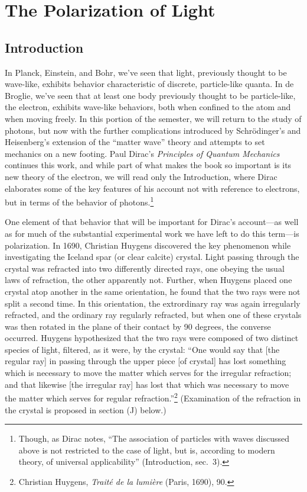 \chapter{The Polarization of Light}



\section*{Introduction}

In Planck, Einstein, and Bohr, we’ve seen that light, previously thought to be wave-like, exhibits behavior characteristic of discrete, particle-like quanta. In de Broglie, we’ve seen that at least one body previously thought to be particle-like, the electron, exhibits wave-like behaviors, both when confined to the atom and when moving freely. In this portion of the semester, we will return to the study of photons, but now with the further complications introduced by Schr\"odinger’s and Heisenberg’s extension of the “matter wave” theory and attempts to set mechanics on a new footing. Paul Dirac’s \emph{Principles of Quantum Mechanics} continues this work, and while part of what makes the book so important is its new theory of the electron, we will read only the Introduction, where Dirac
elaborates some of the key features of his account not with reference to electrons, but in terms of the behavior of photons.\footnote{Though, as Dirac notes, ``The association of particles with waves discussed above is not
	restricted to the case of light, but is, according to modern theory, of universal applicability'' (Introduction, 
	sec.\ 3).}

One element of that behavior that will be important for Dirac’s account---as well as for much of the substantial 
experimental work we have left to do this term---is polarization. In 1690, Christian Huygens discovered 
the key phenomenon while investigating the Iceland spar (or clear calcite) crystal. Light passing through the
crystal was refracted into two differently directed rays, one obeying the usual laws of refraction, the other apparently not. 
Further, when Huygens placed one crystal atop another in the same orientation, he found that the two rays were not split a second time. In this orientation, the extrordinary ray was again irregularly refracted, and the ordinary ray regularly refracted, but when one of these crystals was then rotated in the plane of their contact by 90 degrees, the converse occurred. Huygens hypothesized that the two rays were composed of two distinct species of light, filtered, as it were, by the crystal: ``One would say that [the regular ray] in passing through the upper piece [of crystal] has lost something which is necessary to move the matter which serves for the irregular refraction; and that likewise [the irregular ray] has lost that which was necessary to move the matter which serves for regular refraction.''\footnote{Christian Huygens, \emph{Trait\'e de la lumi\`ere} (Paris, 1690), 90.} (Examination of the refraction in the crystal is proposed in section (J) below.)


